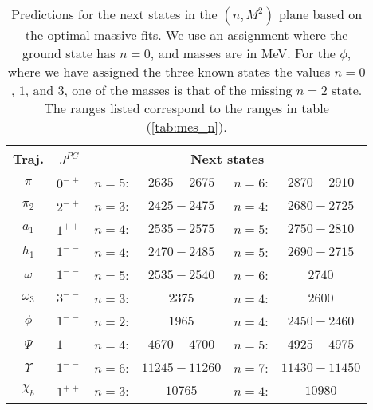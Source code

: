 \documentclass[11pt,a4]{article}
\begin{document}
						\begin{table}[tpb] \centering
					\begin{tabular}{|c|c|cc|cc|} \hline
						
						Traj. & \(J^{PC}\) & \multicolumn{4}{|c|}{Next states} \\ \hline
						
						\(\pi\) & \(0^{-+}\) & \(n = 5\): & \(2635-2675\) & \(n = 6\): & \(2870-2910\) \\
						
						\(\pi_2\) & \(2^{-+}\) & \(n = 3\): & \(2425-2475\) & \(n = 4\): & \(2680-2725\) \\
						
						\(a_1\) & \(1^{++}\) & \(n = 4\): & \(2535-2575\) & \(n = 5\): & \(2750-2810\) \\
						
						\(h_1\) & \(1^{--}\) & \(n = 4\): & \(2470-2485\) & \(n = 5\): & \(2690-2715\) \\
					
						\(\omega\) & \(1^{--}\) & \(n = 5\): & \(2535-2540\) & \(n = 6\): & \(2740\) \\
						
						\(\omega_3\) & \(3^{--}\) & \(n = 3\): & \(2375\) & \(n = 4\): & \(2600\) \\
						
						\(\phi\) & \(1^{--}\) & \(n = 2\): & \(1965\) & \(n = 4\): & \(2450-2460\) \\
						
						\(\Psi\) & \(1^{--}\) & \(n = 4\): & \(4670-4700\) & \(n = 5\): & \(4925-4975\) \\
						
						\(\Upsilon\) & \(1^{--}\) & \(n = 6\): & \(11245-11260\) & \(n = 7\): & \(11430-11450\) \\
						
						\(\chi_b\) & \(1^{++}\) & \(n = 3\): & \(10765\) & \(n = 4\): & \(10980\) \\
						
					\hline \end{tabular}

					\caption{\label{tab:predictions_n} Predictions for the next states in the \((n,M^2)\) plane based on the optimal massive fits. We use an assignment where the ground state has \(n = 0\), and masses are in MeV. For the \(\phi\), where we have assigned the three known states the values \(n = 0\), \(1\), and \(3\), one of the masses is that of the missing \(n = 2\) state. The ranges listed correspond to the ranges in table (\ref{tab:mes_n}).}

					\end{table}

					\clearpage




\end{document}

